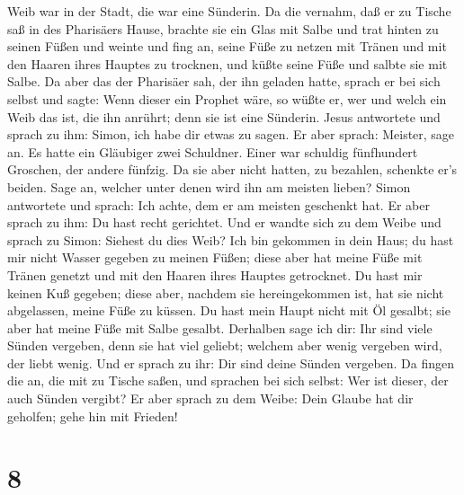 Weib war in der Stadt, die war eine Sünderin. Da die vernahm, daß er zu
Tische saß in des Pharisäers Hause, brachte sie ein Glas mit Salbe
 und trat hinten zu seinen Füßen und weinte und fing an,
seine Füße zu netzen mit Tränen und mit den Haaren ihres Hauptes zu
trocknen, und küßte seine Füße und salbte sie mit Salbe. 
Da aber das der Pharisäer sah, der ihn geladen hatte, sprach er bei sich
selbst und sagte: Wenn dieser ein Prophet wäre, so wüßte er, wer und
welch ein Weib das ist, die ihn anrührt; denn sie ist eine Sünderin.
 Jesus antwortete und sprach zu ihm: Simon, ich habe dir
etwas zu sagen. Er aber sprach: Meister, sage an.  Es hatte
ein Gläubiger zwei Schuldner. Einer war schuldig fünfhundert Groschen,
der andere fünfzig.  Da sie aber nicht hatten, zu bezahlen,
schenkte er's beiden. Sage an, welcher unter denen wird ihn am meisten
lieben?  Simon antwortete und sprach: Ich achte, dem er am
meisten geschenkt hat. Er aber sprach zu ihm: Du hast recht gerichtet.
 Und er wandte sich zu dem Weibe und sprach zu Simon:
Siehest du dies Weib? Ich bin gekommen in dein Haus; du hast mir nicht
Wasser gegeben zu meinen Füßen; diese aber hat meine Füße mit Tränen
genetzt und mit den Haaren ihres Hauptes getrocknet.  Du
hast mir keinen Kuß gegeben; diese aber, nachdem sie hereingekommen ist,
hat sie nicht abgelassen, meine Füße zu küssen.  Du hast
mein Haupt nicht mit Öl gesalbt; sie aber hat meine Füße mit Salbe
gesalbt.  Derhalben sage ich dir: Ihr sind viele Sünden
vergeben, denn sie hat viel geliebt; welchem aber wenig vergeben wird,
der liebt wenig.  Und er sprach zu ihr: Dir sind deine
Sünden vergeben.  Da fingen die an, die mit zu Tische
saßen, und sprachen bei sich selbst: Wer ist dieser, der auch Sünden
vergibt?  Er aber sprach zu dem Weibe: Dein Glaube hat dir
geholfen; gehe hin mit Frieden!

\hypertarget{section-7}{%
\section{8}\label{section-7}}

